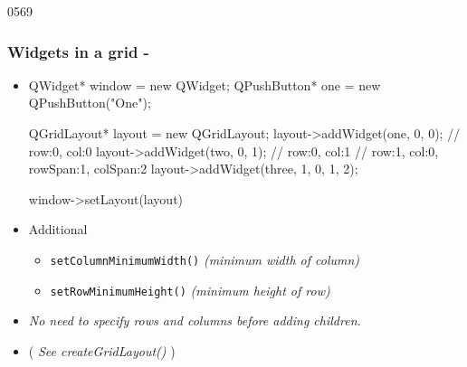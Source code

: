 \begin{slide}[fragile]{0569}\frametitle{Widgets in a grid - }
\begin{itemize}           
  \item[] \begin{cpp}
QWidget* window = new QWidget;
QPushButton* one = new QPushButton("One");
\end{cpp}
\begin{cpp} 
QGridLayout* layout = new QGridLayout;
layout->addWidget(one, 0, 0); // row:0, col:0
layout->addWidget(two, 0, 1); // row:0, col:1
// row:1, col:0, rowSpan:1, colSpan:2
layout->addWidget(three, 1, 0, 1, 2); 
\end{cpp}
\begin{cpp} 
window->setLayout(layout)
\end{cpp}                  
  \item Additional
  \begin{itemize}
    \item \texttt{setColumnMinimumWidth()} \emph{(minimum width of column)}
    \item \texttt{setRowMinimumHeight()} \emph{(minimum height of row)}
  \end{itemize}
  \item \textit{No need to specify rows and columns before
  adding children.}
  \item[]  ( \textit{See createGridLayout()} )
\end{itemize}
\end{slide}


